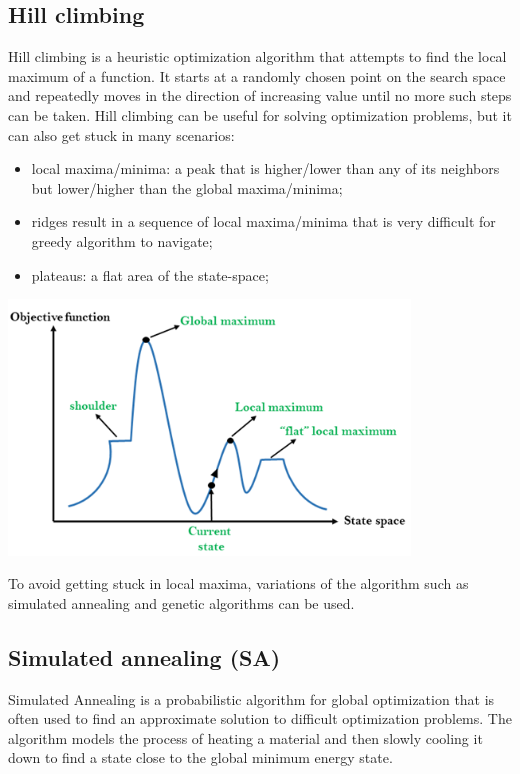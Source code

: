 \documentclass{article}
\begin{document}
\subsection{Hill climbing}

Hill climbing is a heuristic optimization algorithm that attempts to find the local maximum of a function. It starts at a randomly chosen point on the search space and repeatedly moves in the direction of increasing value until no more such steps can be taken. Hill climbing can be useful for solving optimization problems, but it can also get stuck in many scenarios: \\

\begin{itemize}
    \item local maxima/minima: a peak that is higher/lower than any of its neighbors but lower/higher than the global maxima/minima;
    \item ridges result in a sequence of local maxima/minima that is very difficult for greedy algorithm to navigate;
    \item plateaus: a flat area of the state-space;
\end{itemize}

\begin{center}
    \includegraphics[width=0.8\textwidth]{images/hill-climbing.png}    
\end{center}

To avoid getting stuck in local maxima, variations of the algorithm such as simulated annealing and genetic algorithms can be used.

\newpage

\subsection{Simulated annealing (SA)}

Simulated Annealing is a probabilistic algorithm for global optimization that is often used to find an approximate solution to difficult optimization problems. The algorithm models the process of heating a material and then slowly cooling it down to find a state close to the global minimum energy state.\\
\end{document}
